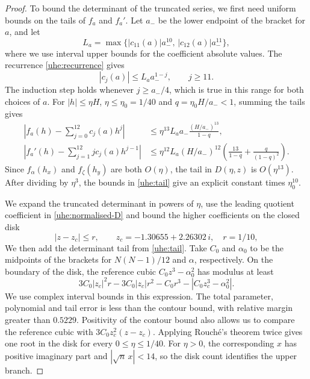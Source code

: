 \documentclass[a4paper,11pt]{amsart}
\numberwithin{equation}{section}
\theoremstyle{plain}
\theoremstyle{definition}
\begin{document}
\begin{proof}
To bound the determinant of the truncated series, we first need
uniform bounds on the tails of \(f_a\) and \(f_a'\). Let \(a_-\)
be the lower endpoint of the bracket for \(a\), and let
\[
 L_a=\max\{|c_{11}(a)|a_-^{10},\,|c_{12}(a)|a_-^{11}\},
\]
where we use interval upper bounds for the coefficient absolute
values. The recurrence \eqref{uhe:recurrence} gives
\[
 |c_j(a)|\le L_a a_-^{1-j},\qquad j\ge11.
\]
The induction step holds whenever \(j\ge a_-/4\), which is true
in this range for both choices of \(a\). For \(|h|\le\eta H\),
\(\eta\le\eta_0=1/40\) and \(q=\eta_0H/a_-<1\), summing the
tails gives
\[
 \begin{split}
 \left|f_a(h)-\sum_{j=0}^{12}c_j(a)h^j\right|
 &\le
 \eta^{13}L_a a_-\frac{(H/a_-)^{13}}{1-q},\\
 \left|f_a'(h)-\sum_{j=1}^{12}jc_j(a)h^{j-1}\right|
 &\le
 \eta^{12}L_a(H/a_-)^{12}
       \left(\frac{13}{1-q}+\frac q{(1-q)^2}\right).
 \end{split}
 \tag{UHE3}\label{uhe:tail}
\]
Since \(f_\alpha(h_x)\) and \(f_\zeta(h_y)\) are both \(O(\eta)\),
the tail in \(D(\eta,z)\) is \(O(\eta^{13})\). After dividing by
\(\eta^3\), the bounds in \eqref{uhe:tail} give an explicit
constant times \(\eta_0^{10}\).

We expand the truncated determinant in powers of \(\eta\), use
the leading quotient coefficient in \eqref{uhe:normalised-D}
and bound the higher coefficients on the closed disk
\[
 |z-z_c|\le r,\qquad
 z_c=-1.30655+2.26302\,i,\quad r=1/10,
\]
We then add the determinant tail from \eqref{uhe:tail}.
Take \(C_0\) and \(\alpha_0\) to be the midpoints of the brackets
for \(N(N-1)/12\) and \(\alpha\), respectively. On the boundary of
the disk, the reference cubic \(C_0z^3-\alpha_0^2\) has modulus
at least
\[
 3C_0|z_c|^2r-3C_0|z_c|r^2-C_0r^3
       -|C_0z_c^3-\alpha_0^2|.
\]
We use complex interval bounds in this expression. The total
parameter, polynomial and tail error is less than the contour
bound, with relative margin greater than \(0.5229\). Positivity
of the contour bound also allows us to compare the reference cubic
with \(3C_0z_c^2(z-z_c)\). Applying Rouch\'e's theorem twice gives
one root in the disk for every \(0\le\eta\le1/40\). For
\(\eta>0\), the corresponding \(x\) has positive imaginary part
and \(|\sqrt n\,x|<14\), so the disk count identifies the upper
branch.


\end{proof}
\end{document}
